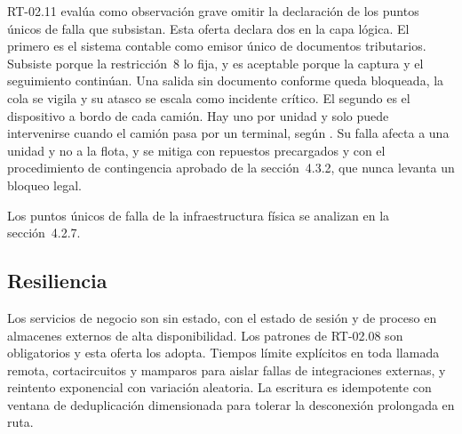 RT-02.11 evalúa como observación grave omitir la declaración de los puntos únicos de falla que
subsistan. Esta oferta declara dos en la capa lógica. El primero es el sistema contable como emisor
único de documentos tributarios. Subsiste porque la restricción~8 lo fija, y es aceptable porque la
captura y el seguimiento continúan. Una salida sin documento conforme queda bloqueada, la cola se vigila
y su atasco se escala como incidente crítico. El segundo es el dispositivo a bordo de cada camión. Hay
uno por unidad y solo puede intervenirse cuando el camión pasa por un terminal, según
. Su falla afecta a una unidad y no a la flota, y se mitiga con repuestos
precargados y con el procedimiento de contingencia aprobado de la sección~4.3.2, que nunca levanta un
bloqueo legal.

Los puntos únicos de falla de la infraestructura física se analizan en la sección~4.2.7.

\subsection{Resiliencia}\label{sec:4-resiliencia}

Los servicios de negocio son sin estado, con el estado de sesión y de proceso en almacenes externos de
alta disponibilidad. Los patrones de RT-02.08 son obligatorios y esta oferta los adopta. Tiempos
límite explícitos en toda llamada remota, cortacircuitos y mamparos para aislar fallas de
integraciones externas, y reintento exponencial con variación aleatoria. La escritura es idempotente
con ventana de deduplicación dimensionada para tolerar la desconexión prolongada en ruta.

